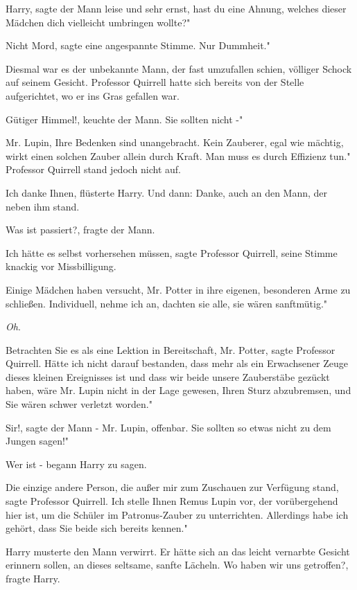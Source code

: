 \glqq{}Harry\grqq{}, sagte der Mann leise und sehr ernst, \glqq{}hast du eine
Ahnung, welches dieser Mädchen dich vielleicht umbringen wollte?"

\glqq{}Nicht Mord\grqq{}, sagte eine angespannte Stimme. \glqq{}Nur Dummheit."

Diesmal war es der unbekannte Mann, der fast umzufallen schien, völliger Schock
auf seinem Gesicht. Professor Quirrell hatte sich bereits von der Stelle
aufgerichtet, wo er ins Gras gefallen war.

\glqq{}Gütiger Himmel!\grqq{}, keuchte der Mann. \glqq{}Sie sollten nicht -"

\glqq{}Mr. Lupin, Ihre Bedenken sind unangebracht. Kein Zauberer, egal wie
mächtig, wirkt einen solchen Zauber allein durch Kraft. Man muss es durch
Effizienz tun." Professor Quirrell stand jedoch nicht auf.

\glqq{}Ich danke Ihnen\grqq{}, flüsterte Harry. Und dann: \glqq{}Danke\grqq{},
auch an den Mann, der neben ihm stand.

\glqq{}Was ist passiert?\grqq{}, fragte der Mann.

\glqq{}Ich hätte es selbst vorhersehen müssen\grqq{}, sagte Professor Quirrell,
seine Stimme knackig vor Missbilligung.

\glqq{}Einige Mädchen haben versucht, Mr. Potter in ihre eigenen, besonderen Arme
zu schließen. Individuell, nehme ich an, dachten sie alle, sie wären
sanftmütig."

\emph{Oh}.

\glqq{}Betrachten Sie es als eine Lektion in Bereitschaft, Mr. Potter\grqq{},
sagte Professor Quirrell. \glqq{}Hätte ich nicht darauf bestanden, dass mehr als
ein Erwachsener Zeuge dieses kleinen Ereignisses ist und dass wir beide unsere
Zauberstäbe gezückt haben, wäre Mr. Lupin nicht in der Lage gewesen, Ihren Sturz
abzubremsen, und Sie wären schwer verletzt worden."

\glqq{}Sir!\grqq{}, sagte der Mann - Mr. Lupin, offenbar. \glqq{}Sie sollten so
etwas nicht zu dem Jungen sagen!"

\glqq{}Wer ist -\grqq{} begann Harry zu sagen.

\glqq{}Die einzige andere Person, die außer mir zum Zuschauen zur Verfügung
stand\grqq{}, sagte Professor Quirrell. \glqq{}Ich stelle Ihnen Remus Lupin vor,
der vorübergehend hier ist, um die Schüler im Patronus-Zauber zu unterrichten.
Allerdings habe ich gehört, dass Sie beide sich bereits kennen."

Harry musterte den Mann verwirrt. Er hätte sich an das leicht vernarbte Gesicht
erinnern sollen, an dieses seltsame, sanfte Lächeln. \glqq{}Wo haben wir uns
getroffen?\grqq{}, fragte Harry.

